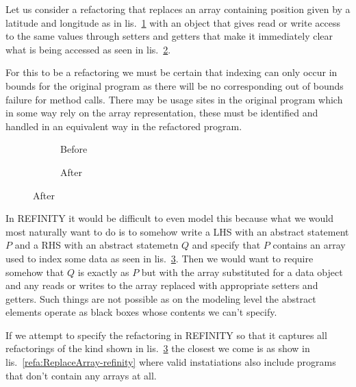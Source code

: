 Let us consider a refactoring that replaces an array containing position given by a latitude and longitude as in lis.~\ref{refa:ReplaceArray-java-before} with an object that gives read or write access to the same values through setters and getters that make it immediately clear what is being accessed as seen in lis.~\ref{refa:ReplaceArray-java-after}.

For this to be a refactoring we must be certain that indexing can only occur in bounds for the original program as there will be no corresponding out of bounds failure for method calls. There may be usage sites in the original program which in some way rely on the array representation, these must be identified and handled in an equivalent way in the refactored program.

\begin{figure}
  \begin{subfigure}[h]{.45\linewidth} 
    
    \caption{Before}
    \label{refa:ReplaceArray-java-before}   
  \end{subfigure}\hspace{1cm}
  \begin{subfigure}[h]{.45\linewidth}
    
    \caption{After}
    \label{refa:ReplaceArray-java-after}
  \end{subfigure}
  \label{refa:ReplaceArray-java}
\end{figure}

In REFINITY it would be difficult to even model this because what we would most naturally want to do is to somehow write a LHS with an abstract statement $P$ and a RHS with an abstract statemetn $Q$ and specify that $P$ contains an array used to index some data as seen in lis.~\ref{refa:ReplaceArray-java}. Then we would want to require somehow that $Q$ is exactly as $P$ but with the array substituted for a data object and any reads or writes to the array replaced with appropriate setters and getters. Such things are not possible as on the modeling level the abstract elements operate as black boxes whose contents we can't specify.

If we attempt to specify the refactoring in REFINITY so that it captures all refactorings of the kind shown in lis.~\ref{refa:ReplaceArray-java} the closest we come is as show in lis.~\ref{refa:ReplaceArray-refinity} where valid instatiations
also include programs that don't contain any arrays at all.

